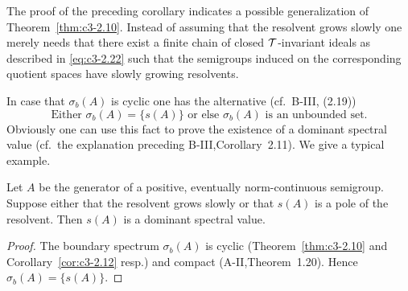 The proof of the preceding corollary indicates a possible generalization of Theorem~\ref{thm:c3-2.10}.
Instead of assuming that the resolvent grows slowly one merely needs that there exist a finite chain of closed $\mathcal{T}$-invariant ideals as described in \eqref{eq:c3-2.22} such that the semigroups induced on the corresponding quotient spaces have slowly growing resolvents.

In case that $\sigma_{b}(A)$ is cyclic one has the alternative (cf.\ B-III, (2.19))
\[
\text{Either $\sigma_{b}(A) = \{s(A)\}$ or else $\sigma_{b}(A)$ is an unbounded set.}
\]
Obviously one can use this fact to prove the existence of a dominant spectral value (cf.\ the explanation preceding B-III,Corollary~2.11).
We give a typical example.
\begin{corollary}\label{cor:c3-2.13}
	Let $A$ be the generator of a positive, eventually norm-continuous semigroup.
	Suppose either that the resolvent grows slowly or that $s(A)$ is a pole of the resolvent.
	Then $s(A)$ is a dominant spectral value.
\end{corollary}

\begin{proof}
The boundary spectrum $\sigma_{b}(A)$ is cyclic (Theorem~\ref{thm:c3-2.10} and Corollary~\ref{cor:c3-2.12} resp.) and compact (A-II,Theorem~1.20).
Hence $\sigma_{b}(A) = \{s(A)\}$.
\end{proof}

